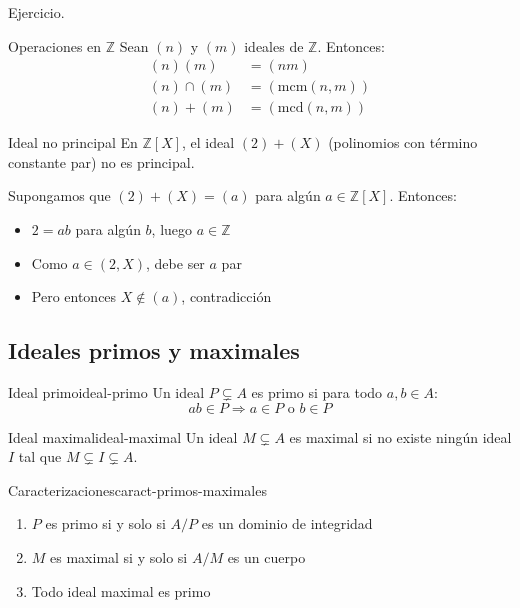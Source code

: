\begin{proofbox}
    Ejercicio.
\end{proofbox}

\begin{example}{Operaciones en \(\mathbb{Z}\)}{}
    Sean \((n)\) y \((m)\) ideales de \(\mathbb{Z}\). Entonces:
    \begin{align*}
        (n)(m) &= (nm) \\
        (n) \cap (m) &= (\mathrm{mcm}(n, m)) \\
        (n) + (m) &= (\mathrm{mcd}(n, m))
    \end{align*}
\end{example}

\begin{example}{Ideal no principal}{}
    En \(\mathbb{Z}[X]\), el ideal \((2) + (X)\) (polinomios con término constante par) no es principal.
\end{example}

\begin{proofbox}
    Supongamos que \((2) + (X) = (a)\) para algún \(a \in \mathbb{Z}[X]\). Entonces:
    \begin{itemize}
        \item \(2 = ab\) para algún \(b\), luego \(a \in \mathbb{Z}\)
        \item Como \(a \in (2, X)\), debe ser \(a\) par
        \item Pero entonces \(X \notin (a)\), contradicción
    \end{itemize}
\end{proofbox}

\subsection{Ideales primos y maximales}

\begin{definition}{Ideal primo}{ideal-primo}
    Un ideal \(P \subsetneq A\) es {primo} si para todo \(a, b \in A\):
    \[
    ab \in P \Rightarrow a \in P \text{ o } b \in P
    \]
\end{definition}

\begin{definition}{Ideal maximal}{ideal-maximal}
    Un ideal \(M \subsetneq A\) es {maximal} si no existe ningún ideal \(I\) tal que \(M \subsetneq I \subsetneq A\).
\end{definition}

\begin{lemma}{Caracterizaciones}{caract-primos-maximales}
    \begin{enumerate}
        \item \(P\) es primo si y solo si \(A/P\) es un dominio de integridad
        \item \(M\) es maximal si y solo si \(A/M\) es un cuerpo
        \item Todo ideal maximal es primo
    \end{enumerate}
\end{lemma}

